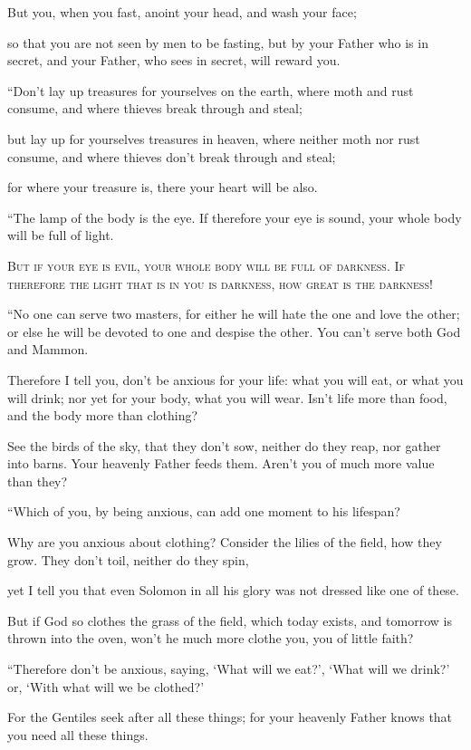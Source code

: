 But you, when you fast, anoint your head, and wash your face;

so that you are not seen by men to be fasting, but by your Father who is in secret, and your Father, who sees in secret, will reward you.

“Don’t lay up treasures for yourselves on the earth, where moth and rust consume, and where thieves break through and steal;

but lay up for yourselves treasures in heaven, where neither moth nor rust consume, and where thieves don’t break through and steal;

for where your treasure is, there your heart will be also.

“The lamp of the body is the eye. If therefore your eye is sound, your whole body will be full of light.




\lettrine{B}{ut if your eye is evil, your whole body will be full of darkness. If therefore the light that is in you is darkness, how great is the darkness!}

“No one can serve two masters, for either he will hate the one and love the other; or else he will be devoted to one and despise the other. You can’t serve both God and Mammon.

Therefore I tell you, don’t be anxious for your life: what you will eat, or what you will drink; nor yet for your body, what you will wear. Isn’t life more than food, and the body more than clothing?

See the birds of the sky, that they don’t sow, neither do they reap, nor gather into barns. Your heavenly Father feeds them. Aren’t you of much more value than they?

“Which of you, by being anxious, can add one moment to his lifespan?

Why are you anxious about clothing? Consider the lilies of the field, how they grow. They don’t toil, neither do they spin,

yet I tell you that even Solomon in all his glory was not dressed like one of these.

But if God so clothes the grass of the field, which today exists, and tomorrow is thrown into the oven, won’t he much more clothe you, you of little faith?

“Therefore don’t be anxious, saying, ‘What will we eat?’, ‘What will we drink?’ or, ‘With what will we be clothed?’

For the Gentiles seek after all these things; for your heavenly Father knows that you need all these things.

